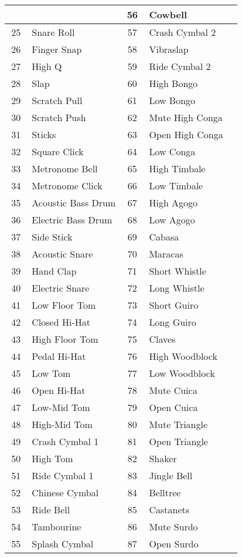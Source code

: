 \begin{tabular}{|c|p{0.4\linewidth}|c|p{0.4\linewidth}|}
	\hline
	& & 56 & Cowbell \\ \hline
	25 & Snare Roll & 57 & Crash Cymbal 2 \\ \hline
	26 & Finger Snap & 58 & Vibraslap \\ \hline
	27 & High Q & 59 & Ride Cymbal 2 \\ \hline
	28 & Slap & 60 & High Bongo \\ \hline
	29 & Scratch Pull & 61 & Low Bongo \\ \hline
	30 & Scratch Push & 62 & Mute High Conga \\ \hline
	31 & Sticks & 63 & Open High Conga \\ \hline
	32 & Square Click & 64 & Low Conga \\ \hline
	33 & Metronome Bell & 65 & High Timbale \\ \hline
	34 & Metronome Click & 66 & Low Timbale \\ \hline
	35 & Acoustic Bass Drum & 67 & High Agogo \\ \hline
	36 & Electric Bass Drum & 68 & Low Agogo \\ \hline
	37 & Side Stick & 69 & Cabasa \\ \hline
	38 & Acoustic Snare & 70 & Maracas \\ \hline
	39 & Hand Clap & 71 & Short Whistle \\ \hline
	40 & Electric Snare & 72 & Long Whistle \\ \hline
	41 & Low Floor Tom & 73 & Short Guiro \\ \hline
	42 & Closed Hi-Hat & 74 & Long Guiro \\ \hline
	43 & High Floor Tom & 75 & Claves \\ \hline
	44 & Pedal Hi-Hat & 76 & High Woodblock \\ \hline
	45 & Low Tom & 77 & Low Woodblock \\ \hline
	46 & Open Hi-Hat & 78 & Mute Cuica \\ \hline
	47 & Low-Mid Tom & 79 & Open Cuica \\ \hline
	48 & High-Mid Tom & 80 & Mute Triangle \\ \hline
	49 & Crash Cymbal 1 & 81 & Open Triangle \\ \hline
	50 & High Tom & 82 & Shaker \\ \hline
	51 & Ride Cymbal 1 & 83 & Jingle Bell \\ \hline
	52 & Chinese Cymbal & 84 & Belltree \\ \hline
	53 & Ride Bell & 85 & Castanets \\ \hline
	54 & Tambourine & 86 & Mute Surdo \\ \hline
	55 & Splash Cymbal & 87 & Open Surdo \\ \hline
\end{tabular}
